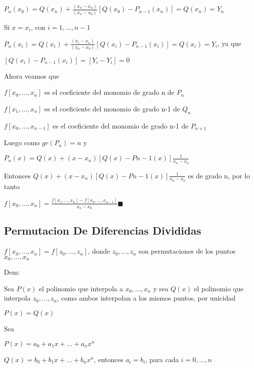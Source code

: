 \documentclass{article}
\begin{document}
$P_n(x_0)=Q(x_n)+\displaystyle\frac{(x_n-x_n)}{(x_n-x_0)}[Q(x_0)-P_{n-1}(x_n)] = Q(x_n)=Y_n$

\vspace{5mm}

Si $x=x_i$, con $i=1,...,n-1$

\vspace{5mm}

$P_n(x_i)=Q(x_i)+\displaystyle\frac{(x_i-x_n)}{(x_n-x_0)}[Q(x_i)-P_{n-1}(x_i)] = Q(x_i)=Y_i$, ya que

\vspace{5mm}

 $[Q(x_i)-P_{n-1}(x_i)]=[Y_i-Y_i]=0$

\vspace{5mm}

Ahora veamos que

$f[x_0,...,x_n]$ es el coeficiente del monomio de grado n de $P_n$

$f[x_1,...,x_n]$ es el coeficiente del monomio de grado n-1 de $Q_n$

$f[x_0,...,x_{n-1}]$ es el coeficiente del monomio de grado n-1 de $P_{n+1}$

Luego como $gr(P_n)=n$ y

$P_n(x) = Q(x) + (x-x_n)[Q(x)-P{n-1}(x)]\displaystyle\frac{1}{x_n-x_0}$

Entonces $Q(x) + (x-x_n)[Q(x)-P{n-1}(x)]\displaystyle\frac{1}{x_n-x_0}$ es de grado n, por lo tanto

$f[x_0,...,x_n] = \displaystyle\frac{f[x_1,...,x_n]-f[x_0,...,x_{n-1}]}{x_n-x_0} $$\blacksquare$


\vspace{10mm}

\subsection{Permutacion De Diferencias Divididas}\label{Permutacion-De-Dif-Divididas}

$f[x_0,...,x_n] = f[z_0,...,z_n]$, donde $z_0,...,z_n$ son permutaciones de los puntos $x_0,...,x_n$

Dem:

Sea $P(x)$ el polinomio que interpola a $x_0,...,x_n$ y sea $Q(x)$ el polinomio que interpola $z_0,...,z_n$, como ambos
interpolan a los mismos puntos, por unicidad

$P(x)=Q(x)$

Sea

$P(x) = a_0+a_1x+...+a_nx^n$

$Q(x) = b_0+b_1x+...+b_nx^n$, entonces $a_i = b_i$, para cada $i=0,...,n$
\end{document}
